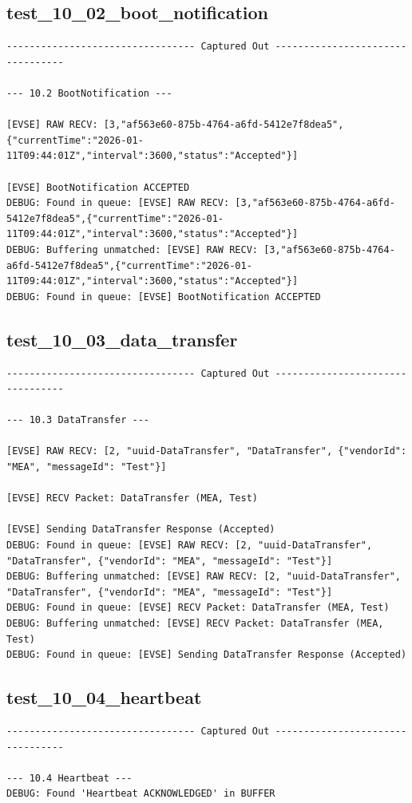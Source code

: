 \documentclass{article}
\begin{document}
\subsection*{test\_10\_02\_boot\_notification}
\begin{lstlisting}
--------------------------------- Captured Out ---------------------------------

--- 10.2 BootNotification ---

[EVSE] RAW RECV: [3,"af563e60-875b-4764-a6fd-5412e7f8dea5",{"currentTime":"2026-01-11T09:44:01Z","interval":3600,"status":"Accepted"}]

[EVSE] BootNotification ACCEPTED
DEBUG: Found in queue: [EVSE] RAW RECV: [3,"af563e60-875b-4764-a6fd-5412e7f8dea5",{"currentTime":"2026-01-11T09:44:01Z","interval":3600,"status":"Accepted"}]
DEBUG: Buffering unmatched: [EVSE] RAW RECV: [3,"af563e60-875b-4764-a6fd-5412e7f8dea5",{"currentTime":"2026-01-11T09:44:01Z","interval":3600,"status":"Accepted"}]
DEBUG: Found in queue: [EVSE] BootNotification ACCEPTED
\end{lstlisting}
\subsection*{test\_10\_03\_data\_transfer}
\begin{lstlisting}
--------------------------------- Captured Out ---------------------------------

--- 10.3 DataTransfer ---

[EVSE] RAW RECV: [2, "uuid-DataTransfer", "DataTransfer", {"vendorId": "MEA", "messageId": "Test"}]

[EVSE] RECV Packet: DataTransfer (MEA, Test)

[EVSE] Sending DataTransfer Response (Accepted)
DEBUG: Found in queue: [EVSE] RAW RECV: [2, "uuid-DataTransfer", "DataTransfer", {"vendorId": "MEA", "messageId": "Test"}]
DEBUG: Buffering unmatched: [EVSE] RAW RECV: [2, "uuid-DataTransfer", "DataTransfer", {"vendorId": "MEA", "messageId": "Test"}]
DEBUG: Found in queue: [EVSE] RECV Packet: DataTransfer (MEA, Test)
DEBUG: Buffering unmatched: [EVSE] RECV Packet: DataTransfer (MEA, Test)
DEBUG: Found in queue: [EVSE] Sending DataTransfer Response (Accepted)
\end{lstlisting}
\subsection*{test\_10\_04\_heartbeat}
\begin{lstlisting}
--------------------------------- Captured Out ---------------------------------

--- 10.4 Heartbeat ---
DEBUG: Found 'Heartbeat ACKNOWLEDGED' in BUFFER
\end{lstlisting}
\end{document}
